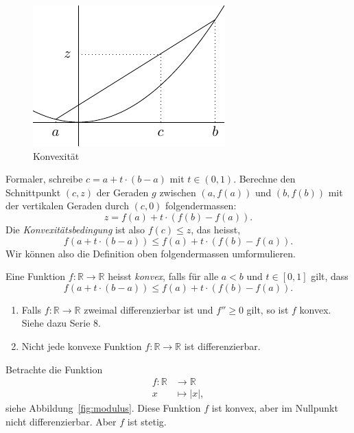 \documentclass[../main.tex]{subfiles}
\begin{document}
\begin{figure}[htb]
  \centering
  \includegraphics{images/convexity}
  \caption{Konvexität}%
  \label{fig:convexity}
\end{figure}

Formaler, schreibe
$
  c = a + t \cdot (b-a)
  $
mit $t \in (0, 1)$.
Berechne den Schnittpunkt $(c, z)$ der
Geraden $g$ zwischen
$(a, f(a))$ und $(b, f(b))$ 
mit der vertikalen Geraden durch $(c, 0)$ 
folgendermassen:
\[
  z = f(a) + t \cdot (f(b) - f(a)).
\]
Die \emph{Konvexitätsbedingung} ist also
$f(c) \leq z$, das heisst,
\[
  f(a + t \cdot (b-a)) \leq f(a) + t\cdot (f(b) - f(a)).
\]
Wir können also die Definition oben folgendermassen
umformulieren.

\begin{definition}
  Eine Funktion $f \colon \mathbb{R} \to \mathbb{R}$ 
  heisst \emph{konvex}, falls für alle $a < b$ 
  und $t \in [0, 1]$ gilt, dass
  \[
    f(a + t \cdot (b - a)) \leq f(a) + t\cdot (f(b) - f(a)).
  \]
\end{definition}

\newpage
\begin{remarks}
  \leavevmode
  \begin{enumerate}[(1)]
    \item Falls $f \colon \mathbb{R} \to \mathbb{R}$ 
      zweimal differenzierbar ist und $f'' \geq 0$ gilt,
      so ist $f$ konvex. Siehe dazu Serie 8.
    \item Nicht jede konvexe Funktion
      $f \colon \mathbb{R} \to \mathbb{R}$ ist
      differenzierbar.
  \end{enumerate}
\end{remarks}

\begin{example}
  Betrachte die Funktion
  \begin{align*}
    f \colon \mathbb{R} & \to \mathbb{R} \\
    x & \mapsto |x|,
  \end{align*}
  siehe Abbildung~\ref{fig:modulus}.
  Diese Funktion $f$ ist konvex, aber im
  Nullpunkt nicht differenzierbar.
  Aber $f$ ist stetig.
\end{example}
\end{document}
